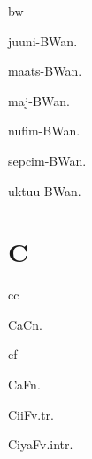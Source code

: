 \begin{multicols*}{2}
\begin{dictroot}{bw}{\bigglot}
    \begin{dictentry}{juu\lilglot ni-BWa\bigglot}{n.}
    \end{dictentry}
    \begin{dictentry}{maats-BWa\bigglot}{n.}
    \end{dictentry}
    \begin{dictentry}{maj-BWa\bigglot}{n.}
    \end{dictentry}
    \begin{dictentry}{nufim-BWa\bigglot}{n.}
    \end{dictentry}
    \begin{dictentry}{sepcim-BWa\bigglot}{n.}
    \end{dictentry}
    \begin{dictentry}{uktuu-BWa\bigglot}{n.}
    \end{dictentry}
\end{dictroot}

\section*{C}

\begin{dictroot}{c}{c}
    \begin{dictentry}{CaC}{n.}
    \end{dictentry}
\end{dictroot}

\begin{dictroot}{c}{f}
    \begin{dictentry}{CaF}{n.}
    \end{dictentry}
    \begin{dictentry}{CiiF}{v.tr.}
    \end{dictentry}
    \begin{dictentry}{CiyaF}{v.intr.}
    \end{dictentry}
\end{dictroot}


\end{multicols*}
